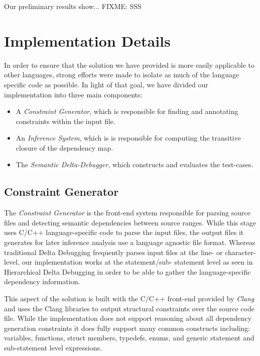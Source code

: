 \documentclass[preprint]{acm_proc_article-sp}
\begin{document}
Our preliminary results show... FIXME: SSS


\section{Implementation Details}

In order to ensure that the solution we have provided is more easily applicable
to other languages, strong efforts were made to isolate as much of the language
specific code as possible. In light of that goal, we have divided our
implementation into three main components:

\begin{itemize}
\item A \emph{Constraint Generator}, which is responsible for finding and
      annotating constraints within the input file.
\item An \emph{Inference System}, which is is responsible for
      computing the transitive closure of the dependency map.
\item The \emph{Semantic Delta-Debugger}, which constructs and evaluates the
      test-cases.
\end{itemize}

\subsection{Constraint Generator}

The \emph{Constraint Generator} is the front-end system responsible for parsing
source files and detecting semantic dependencies between source ranges. While
this stage uses C/C++ language-specific code to parse the input files, the
output files it generates for later inference analysis use a language agnostic
file format. Whereas traditional Delta Debugging frequently parses input files
at the line- or character-level, our implementation works at the statement/sub-
statement level as seen in Hierarchical Delta Debugging \citep{hdd} in order to
be able to gather the language-specific dependency information.

This aspect of the solution is built with the C/C++ front-end provided by
\emph{Clang} \citep{clang} and uses the Clang libraries to output structural
constraints over the source code file. While the implementation does not support
reasoning about all dependency generation constraints it does fully support many
common constructs including: variables, functions, struct members, typedefs,
enums, and generic statement and sub-statement level expressions.
\end{document}
